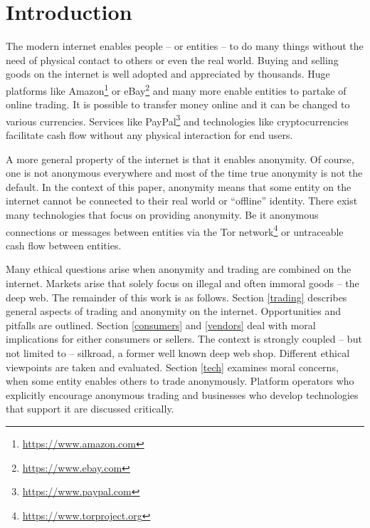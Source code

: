 \section{Introduction}


The modern internet enables people -- or entities -- to do many things without the need of physical contact to others or even the real world. Buying and selling goods on the internet is well adopted and appreciated by thousands. Huge platforms like Amazon\footnote{\url{https://www.amazon.com}} or eBay\footnote{\url{https://www.ebay.com}} and many more enable entities to partake of online trading. It is possible to transfer money online and it can be changed to various currencies. Services like PayPal\footnote{\url{https://www.paypal.com}} and technologies like cryptocurrencies facilitate cash flow without any physical interaction for end users.

A more general property of the internet is that it enables anonymity. Of course, one is not anonymous everywhere and most of the time true anonymity is not the default. In the context of this paper, anonymity means that some entity on the internet cannot be connected to their real world or ``offline'' identity. There exist many technologies that focus on providing anonymity. Be it anonymous connections or messages between entities via the Tor network\footnote{\url{https://www.torproject.org}} or untraceable cash flow between entities.

Many ethical questions arise when anonymity and trading are combined on the internet. Markets arise that solely focus on illegal and often immoral goods -- the deep web. The remainder of this work is as follows. Section \ref{trading} describes general aspects of trading and anonymity on the internet. Opportunities and pitfalls are outlined. Section \ref{consumers} and \ref{vendors} deal with moral implications for either consumers or sellers. The context is strongly coupled -- but not limited to -- silkroad\cite{silkroad2013}, a former well known deep web shop. Different ethical viewpoints are taken and evaluated. Section \ref{tech} examines moral concerns, when some entity enables others to trade anonymously. Platform operators who explicitly encourage anonymous trading and businesses who develop technologies that support it are discussed critically.